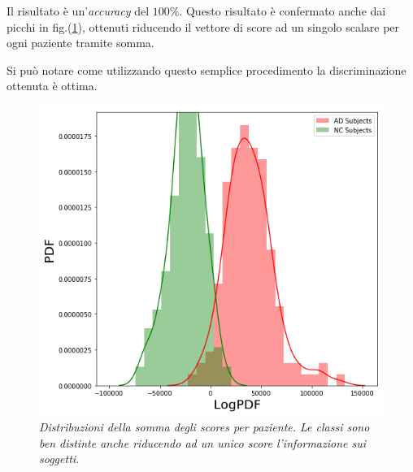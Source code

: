 \documentclass[12pt,openright,a4paper]{article}
\begin{document}
Il risultato è un'\textit{accuracy} del  $100\%$. Questo risultato è confermato anche dai picchi in fig.(\ref{logpdf-dist}), ottenuti riducendo il vettore di score ad un singolo scalare per ogni paziente tramite  somma.

Si può notare come utilizzando questo semplice procedimento la discriminazione ottenuta è ottima.

\begin{figure}[!h]
\centering
\includegraphics[scale=0.6]{logpdf-dist}
\caption{\textit{Distribuzioni della somma degli scores per paziente. Le classi sono ben distinte anche riducendo ad un unico score l'informazione sui soggetti.}}
\label{logpdf-dist}
\end{figure}
\end{document}
